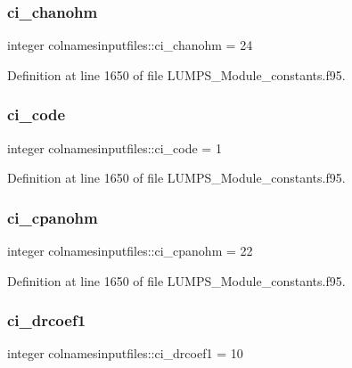 \subsubsection{\texorpdfstring{ci\+\_\+chanohm}{ci\_chanohm}}
{\footnotesize\ttfamily integer colnamesinputfiles\+::ci\+\_\+chanohm = 24}



Definition at line 1650 of file L\+U\+M\+P\+S\+\_\+\+Module\+\_\+constants.\+f95.

\mbox{\label{namespacecolnamesinputfiles_a0abf7a2adf2e8ef2d2b9b37c03042dbd}} 
\subsubsection{\texorpdfstring{ci\+\_\+code}{ci\_code}}
{\footnotesize\ttfamily integer colnamesinputfiles\+::ci\+\_\+code = 1}



Definition at line 1650 of file L\+U\+M\+P\+S\+\_\+\+Module\+\_\+constants.\+f95.

\mbox{\label{namespacecolnamesinputfiles_ac575448f7cd32bb1c4f0498c6ad06ce2}} 
\subsubsection{\texorpdfstring{ci\+\_\+cpanohm}{ci\_cpanohm}}
{\footnotesize\ttfamily integer colnamesinputfiles\+::ci\+\_\+cpanohm = 22}



Definition at line 1650 of file L\+U\+M\+P\+S\+\_\+\+Module\+\_\+constants.\+f95.

\mbox{\label{namespacecolnamesinputfiles_adcf82346df376a809e080d0363fc4a87}} 
\subsubsection{\texorpdfstring{ci\+\_\+drcoef1}{ci\_drcoef1}}
{\footnotesize\ttfamily integer colnamesinputfiles\+::ci\+\_\+drcoef1 = 10}



